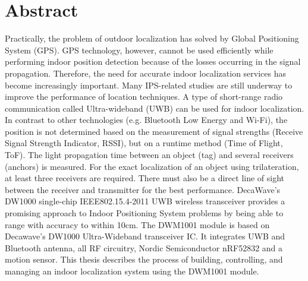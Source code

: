 \documentclass[\main/thesis.tex]{subfiles}
\begin{document}
\graphicspath{{imgs/}{00_misc/imgs/}}

\chapter*{Abstract}

Practically, the problem of outdoor localization has solved by  Global Positioning System (GPS).  GPS technology, however, cannot be used efficiently while performing indoor position detection  because of the losses occurring in the signal propagation. Therefore, the need for accurate indoor localization services has become increasingly important. Many IPS-related studies are still underway to improve the performance of location techniques.
\newline\newline
A type of short-range radio communication called Ultra-wideband (UWB) can be used for indoor localization. In contrast to other technologies (e.g. Bluetooth Low Energy and Wi-Fi), the position is not determined based on the measurement of signal strengths (Receive Signal Strength Indicator, RSSI), but on a runtime method (Time of Flight, ToF). The light propagation time between an object (tag) and several receivers (anchors) is measured. For the exact localization of an object using trilateration, at least three receivers are required. There must also be a direct line of sight between the receiver and transmitter for the best performance.
\newline\newline
DecaWave's DW1000 single-chip IEEE802.15.4-2011 UWB wireless transceiver provides a promising approach to Indoor Positioning System problems by being able to range with accuracy to within 10cm. The DWM1001 module is based on Decawave's DW1000 Ultra-Wideband transceiver IC. It integrates UWB and Bluetooth antenna, all RF circuitry, Nordic Semiconductor nRF52832 and a motion sensor. This thesis describes the process of building, controlling, and managing an indoor localization system using the DWM1001 module.
\end{document}
